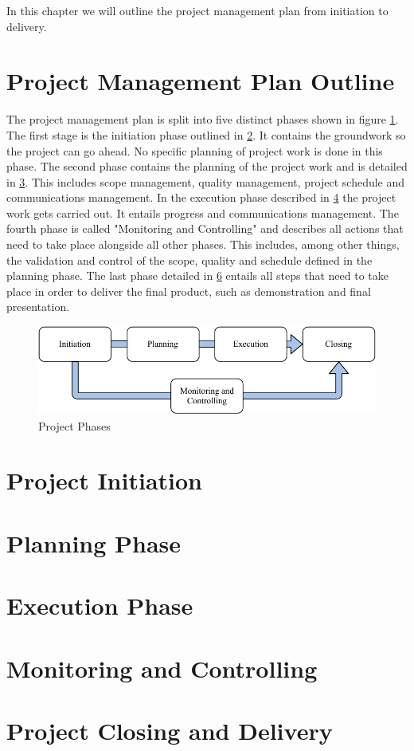In this chapter we will outline the project management plan from initiation to delivery.

\section{Project Management Plan Outline}
\label{ch:projectplanoutline}

The project management plan is split into five distinct phases shown in figure \ref{fig:projectphases}. The first stage is the initiation phase outlined in \ref{ch:projectinitiation}. It contains the groundwork so the project can go ahead. No specific planning of project work is done in this phase. The second phase contains the planning of the project work and is detailed in \ref{ch:planningphase}. This includes scope management, quality management, project schedule and communications management. In the execution phase described in \ref{ch:executionphase} the project work gets carried out. It entails progress and communications management. The fourth phase is called "Monitoring and Controlling" and describes all actions that need to take place alongside all other phases. This includes, among other things, the validation and control of the scope, quality and schedule defined in the planning phase. The last phase detailed in \ref{ch:projectclosing} entails all steps that need to take place in order to deliver the final product, such as demonstration and final presentation.

\begin{figure}
  \centering
  \includegraphics{data/figures/project_lifecycle.pdf}
  \caption{Project Phases}
  \label{fig:projectphases}
\end{figure}


\section{Project Initiation}
\label{ch:projectinitiation}

\section{Planning Phase}
\label{ch:planningphase}

\section{Execution Phase}
\label{ch:executionphase}

\section{Monitoring and Controlling}
\label{ch:monitoringcontrolling}

\section{Project Closing and Delivery}
\label{ch:projectclosing}
